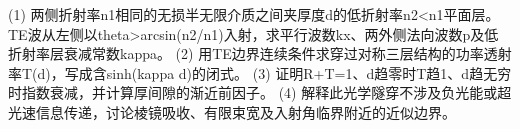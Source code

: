 (1) 两侧折射率n1相同的无损半无限介质之间夹厚度d的低折射率n2<n1平面层。TE波从左侧以theta>arcsin(n2/n1)入射，求平行波数kx、两外侧法向波数p及低折射率层衰减常数kappa。
(2) 用TE边界连续条件求穿过对称三层结构的功率透射率T(d)，写成含sinh(kappa d)的闭式。
(3) 证明R+T=1、d趋零时T趋1、d趋无穷时指数衰减，并计算厚间隙的渐近前因子。
(4) 解释此光学隧穿不涉及负光能或超光速信息传递，讨论棱镜吸收、有限束宽及入射角临界附近的近似边界。
